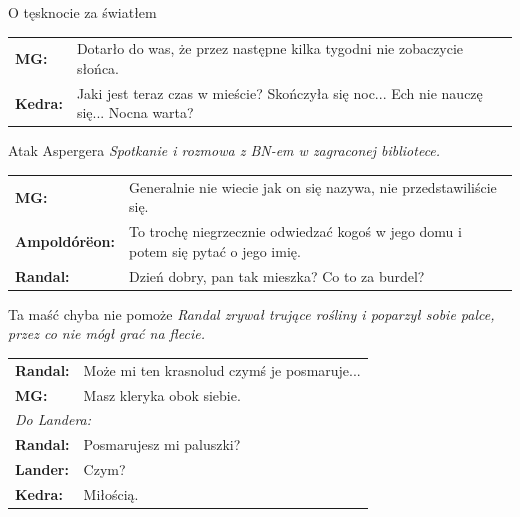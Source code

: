 \documentclass[10pt,twoside,twocolumn]{book}
\begin{document}
\begin{rpg-quotebox}{O tęsknocie za światłem}
   \begin{tabularx}{\columnwidth}{lX}
      \textbf{MG:} & Dotarło do was, że przez następne kilka tygodni nie zobaczycie słońca.\\
      \textbf{Kedra:} & Jaki jest teraz czas w mieście? Skończyła się noc... Ech nie nauczę się... Nocna warta?\\
   \end{tabularx}
\end{rpg-quotebox}


\begin{rpg-quotebox}{Atak Aspergera}
   \textit{Spotkanie i rozmowa z BN-em w zagraconej bibliotece.}\\

   \begin{tabularx}{\columnwidth}{lX}
      \textbf{MG:} & Generalnie nie wiecie jak on się nazywa, nie przedstawiliście się.\\
      \textbf{Ampoldórëon:} & To trochę niegrzecznie odwiedzać kogoś w jego domu i potem się pytać o jego imię.\\
      \textbf{Randal:} & Dzień dobry, pan tak mieszka? Co to za burdel?\\
   \end{tabularx}
\end{rpg-quotebox}


\begin{rpg-quotebox}{Ta maść chyba nie pomoże}
   \textit{Randal zrywał trujące rośliny i poparzył sobie palce, przez co nie mógł grać na flecie.}\\

   \begin{tabularx}{\columnwidth}{lX}
      \textbf{Randal:} & Może mi ten krasnolud czymś je posmaruje...\\
      \textbf{MG:} & Masz kleryka obok siebie.\\
      \multicolumn{2}{l}{\textit{Do Landera:}}\\
      \textbf{Randal:} & Posmarujesz mi paluszki?\\
      \textbf{Lander:} & Czym?\\
      \textbf{Kedra:} & Miłością.\\
   \end{tabularx}
\end{rpg-quotebox}
\end{document}

